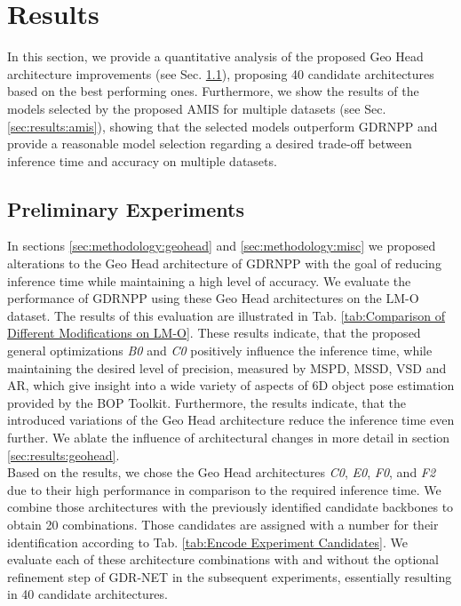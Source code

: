 \section{Results}

In this section, we provide a quantitative analysis of the proposed Geo Head architecture improvements (see Sec. \ref{sec:results:preliminary}), proposing 40 candidate architectures based on the best performing ones.
Furthermore, we show the results of the models selected by the proposed AMIS for multiple datasets (see Sec. \ref{sec:results:amis}), showing that the selected models outperform GDRNPP and provide a reasonable model selection regarding a desired trade-off between inference time and accuracy on multiple datasets.


\subsection{Preliminary Experiments}
\label{sec:results:preliminary}

In sections \ref{sec:methodology:geohead} and \ref{sec:methodology:misc} we proposed alterations to the Geo Head architecture of GDRNPP with the goal of reducing inference time while maintaining a high level of accuracy.
We evaluate the performance of GDRNPP using these Geo Head architectures on the LM-O dataset.
The results of this evaluation are illustrated in Tab. \ref{tab:Comparison of Different Modifications on LM-O}.
These results indicate, that the proposed general optimizations \textit{B0} and \textit{C0} positively influence the inference time, while maintaining the desired level of precision, measured by MSPD, MSSD, VSD and AR, which give insight into a wide variety of aspects of 6D object pose estimation provided by the BOP Toolkit\cite{hodan2024bop}.
Furthermore, the results indicate, that the introduced variations of the Geo Head architecture reduce the inference time even further.
We ablate the influence of architectural changes in more detail in section \ref{sec:results:geohead}.\\
%
Based on the results, we chose the Geo Head architectures \textit{C0}, \textit{E0}, \textit{F0}, and \textit{F2} due to their high performance in comparison to the required inference time.
We combine those architectures with the previously identified candidate backbones to obtain 20 combinations.
Those candidates are assigned with a number for their identification according to Tab. \ref{tab:Encode Experiment Candidates}.
We evaluate each of these architecture combinations with and without the optional refinement step of GDR-NET in the subsequent experiments, essentially resulting in 40 candidate architectures.


